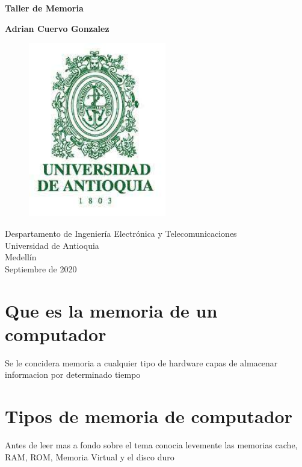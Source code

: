 \documentclass{article}
\begin{document}
	
	\begin{titlepage}
		\begin{center}
			\vspace*{1cm}
			
			\Huge
			\textbf{Taller de Memoria}
			
			\vspace{0.5cm}
			\LARGE
			
			\vspace{1.5cm}
			
			\textbf{Adrian Cuervo Gonzalez}
			
			\vfill
			\begin{figure}[h]
				\includegraphics[width=6cm]{Images/EscudoUdeA.jpg}
				\centering
				\label{fig:EscudoUdeA}
			\end{figure}
			
			\vspace{0.8cm}
			
			\Large
			Despartamento de Ingeniería Electrónica y Telecomunicaciones\\
			Universidad de Antioquia\\
			Medellín\\
			Septiembre de 2020
			
		\end{center}
	\end{titlepage}
	
	\tableofcontents
	\newpage
	\section{Que es la memoria de un computador}\label{intro}
	Se le concidera memoria a cualquier tipo de hardware capas de almacenar informacion por determinado tiempo
	
	\section{Tipos de memoria de computador} \label{contenido}
	Antes de leer mas a fondo sobre el tema conocia levemente las memorias cache, RAM, ROM, Memoria Virtual y el disco duro
\end{document}

